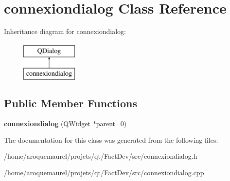\hypertarget{classconnexiondialog}{\section{connexiondialog Class Reference}
\label{classconnexiondialog}
}
Inheritance diagram for connexiondialog\-:\begin{figure}[H]
\begin{center}
\leavevmode
\includegraphics[height=2.000000cm]{dc/db6/classconnexiondialog}
\end{center}
\end{figure}
\subsection*{Public Member Functions}
\begin{DoxyCompactItemize}
\item 
\hypertarget{classconnexiondialog_a96f24b7b0ed87e2cbe4866d1b931710e}{{\bfseries connexiondialog} (Q\-Widget $\ast$parent=0)}\label{classconnexiondialog_a96f24b7b0ed87e2cbe4866d1b931710e}

\end{DoxyCompactItemize}


The documentation for this class was generated from the following files\-:\begin{DoxyCompactItemize}
\item 
/home/aroquemaurel/projets/qt/\-Fact\-Dev/src/connexiondialog.\-h\item 
/home/aroquemaurel/projets/qt/\-Fact\-Dev/src/connexiondialog.\-cpp\end{DoxyCompactItemize}
